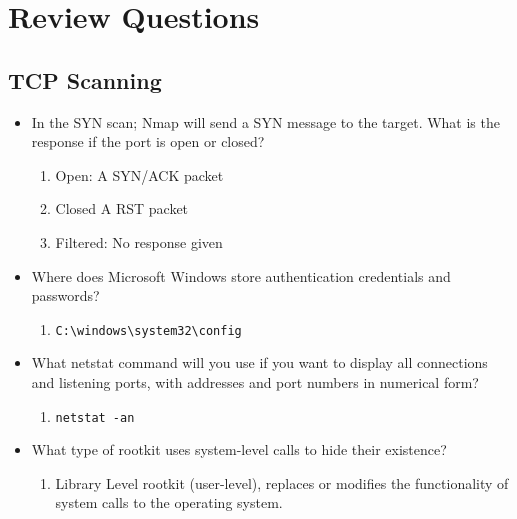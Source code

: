 \section{Review Questions}

\subsection{TCP Scanning}
\begin{itemize}
    \item In the SYN scan; Nmap will send a SYN message to the target. What is the response if the port is open or closed?
    \begin{enumerate}
        \item Open: A SYN/ACK packet
        \item Closed A RST packet
        \item Filtered: No response given
    \end{enumerate}
\end{itemize}

\begin{itemize}
    \item Where does Microsoft Windows store authentication credentials and passwords?
    \begin{enumerate}
        \item \verb|C:\windows\system32\config|
    \end{enumerate}
    \item What netstat command will you use if you want to display all connections and listening ports, with addresses and port numbers in numerical form?
    \begin{enumerate}
        \item \verb|netstat -an|
    \end{enumerate}
    \item What type of rootkit uses system-level calls to hide their existence?
    \begin{enumerate}
        \item Library Level rootkit (user-level), replaces or modifies the functionality of system calls to the operating system.
    \end{enumerate}
\end{itemize}